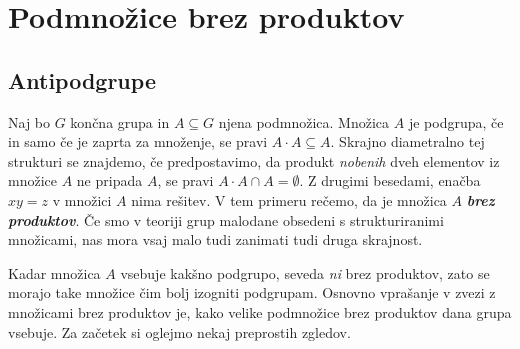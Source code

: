 \documentclass[11pt]{book}
\def\definicija{\color{rdeca}\bf\em}
\theoremstyle{definition}
\theoremstyle{zgled}
\theoremstyle{odprtproblem}
\theoremstyle{domacanaloga}
\theoremstyle{izrek}
\begin{document}
\section{Podmnožice brez produktov}

\subsection{Antipodgrupe}

Naj bo $G$ končna grupa in $A \subseteq G$ njena podmnožica. Množica $A$ je podgrupa, če in samo če je zaprta za množenje, se pravi $A \cdot A \subseteq A$. Skrajno diametralno tej strukturi se znajdemo, če predpostavimo, da produkt \emph{nobenih} dveh elementov iz množice $A$ ne pripada $A$, se pravi $A \cdot A \cap A = \emptyset$. Z drugimi besedami, enačba $xy = z$ v množici $A$ nima rešitev. V tem primeru rečemo, da je množica $A$ {\definicija brez produktov}. Če smo v teoriji grup malodane obsedeni s strukturiranimi množicami, nas mora vsaj malo tudi zanimati tudi druga skrajnost. 

Kadar množica $A$ vsebuje kakšno podgrupo, seveda \emph{ni} brez produktov, zato se morajo take množice čim bolj izogniti podgrupam. Osnovno vprašanje v zvezi z množicami brez produktov je, kako velike podmnožice brez produktov dana grupa vsebuje. Za začetek si oglejmo nekaj preprostih zgledov.
\end{document}
